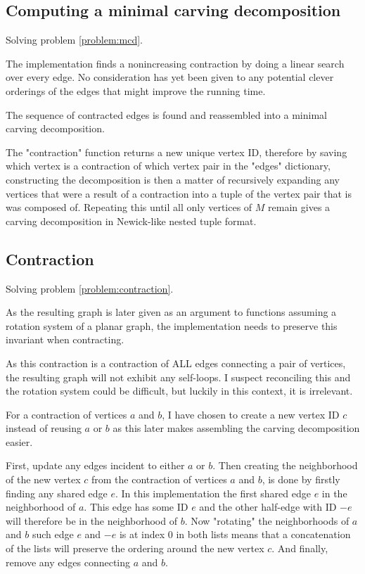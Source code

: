 \documentclass{article}
\begin{document}
	
	\subsection{Computing a minimal carving decomposition}\label{impl:mcd}

		Solving problem \ref{problem:mcd}.

		The implementation finds a nonincreasing contraction by doing a linear search over every edge. No consideration has yet been given to any potential clever orderings of the edges that might improve the running time.

		The sequence of contracted edges is found and reassembled into a minimal carving decomposition.

		The "contraction" function returns a new unique vertex ID, therefore by saving which vertex is a contraction of which vertex pair in the "edges" dictionary, constructing the decomposition is then a matter of recursively expanding any vertices that were a result of a contraction into a tuple of the vertex pair that is was composed of. Repeating this until all only vertices of $M$ remain gives a carving decomposition in Newick-like nested tuple format.


	\subsection{Contraction}\label{impl:contraction}

		Solving problem \ref{problem:contraction}.

		As the resulting graph is later given as an argument to functions assuming a rotation system of a planar graph, the implementation needs to preserve this invariant when contracting.

		As this contraction is a contraction of ALL edges connecting a pair of vertices, the resulting graph will not exhibit any self-loops. I suspect reconciling this and the rotation system could be difficult, but luckily in this context, it is irrelevant.

		For a contraction of vertices $a$ and $b$, I have chosen to create a new vertex ID $c$ instead of reusing $a$ or $b$ as this later makes assembling the carving decomposition easier.

		First, update any edges incident to either $a$ or $b$. Then creating the neighborhood of the new vertex $c$ from the contraction of vertices $a$ and $b$, is done by firstly finding any shared edge $e$. In this implementation the first shared edge $e$ in the neighborhood of $a$. This edge has some ID $e$ and the other half-edge with ID $-e$ will therefore be in the neighborhood of $b$. Now  "rotating" the neighborhoods of $a$ and $b$ such edge $e$ and $-e$ is at index 0 in both lists means that a concatenation of the lists will preserve the ordering around the new vertex $c$. And finally, remove any edges connecting $a$ and $b$.
		
\end{document}
